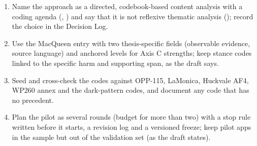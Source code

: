 \begin{thesisbox}
\begin{enumerate}[leftmargin=1.3em]
\item Name the approach as a directed, codebook-based content analysis with a coding agenda (, ) and say that it is not reflexive thematic analysis (); record the choice in the Decision Log.
\item Use the MacQueen entry with two thesis-specific fields (observable evidence, source language) and anchored levels for Axis C strengths; keep stance codes linked to the specific harm and supporting span, as the draft says.
\item Seed and cross-check the codes against OPP-115, LaMonica, Huckvale AF4, WP260 annex and the dark-pattern codes, and document any code that has no precedent.
\item Plan the pilot as several rounds (budget for more than two) with a stop rule written before it starts, a revision log and a versioned freeze; keep pilot apps in the sample but out of the validation set (as the draft states).
\end{enumerate}
\end{thesisbox}
